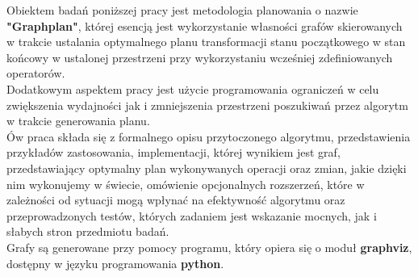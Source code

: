 \begin{streszczenie}
Obiektem badań poniższej pracy jest metodologia planowania
o nazwie \textbf{"Graphplan"}, której esencją jest wykorzystanie
własności grafów skierowanych w trakcie ustalania optymalnego planu transformacji
stanu początkowego w stan końcowy w ustalonej przestrzeni przy wykorzystaniu wcześniej zdefiniowanych
operatorów. \\
Dodatkowym aspektem pracy jest użycie programowania ograniczeń w celu zwiększenia wydajności jak i zmniejszenia
przestrzeni poszukiwań przez algorytm w trakcie generowania planu. \\
Ów praca składa się z formalnego opisu przytoczonego algorytmu, przedstawienia przykładów zastosowania,
implementacji, której wynikiem jest graf, przedstawiający optymalny plan wykonywanych operacji oraz zmian, jakie dzięki nim wykonujemy w świecie,
omówienie opcjonalnych rozszerzeń, które w zależności od sytuacji mogą wpłynać na efektywność algorytmu
oraz przeprowadzonych testów, których zadaniem jest wskazanie mocnych, jak i słabych stron przedmiotu badań. \\
Grafy są generowane przy pomocy programu, który opiera się o moduł \textbf{graphviz}, dostępny w języku programowania \textbf{python}.

\end{streszczenie}
